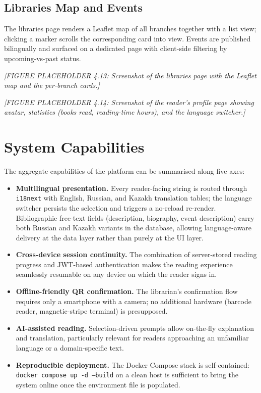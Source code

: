 \documentclass[12pt,a4paper]{report}
\begin{document}
\subsection{Libraries Map and Events}

The libraries page renders a Leaflet map of all branches together with
a list view; clicking a marker scrolls the corresponding card into
view. Events are published bilingually and surfaced on a dedicated
page with client-side filtering by upcoming-vs-past status.

\textit{[FIGURE PLACEHOLDER 4.13: Screenshot of the libraries page
with the Leaflet map and the per-branch cards.]}

\textit{[FIGURE PLACEHOLDER 4.14: Screenshot of the reader's
profile page showing avatar, statistics (books read, reading-time
hours), and the language switcher.]}

\section{System Capabilities}

The aggregate capabilities of the platform can be summarised along
five axes:

\begin{itemize}[leftmargin=*]
    \item \textbf{Multilingual presentation.} Every reader-facing
    string is routed through \texttt{i18next} with English, Russian,
    and Kazakh translation tables; the language switcher persists the
    selection and triggers a no-reload re-render. Bibliographic
    free-text fields (description, biography, event description)
    carry both Russian and Kazakh variants in the database, allowing
    language-aware delivery at the data layer rather than purely at
    the UI layer.
    \item \textbf{Cross-device session continuity.} The combination of
    server-stored reading progress and JWT-based authentication makes
    the reading experience seamlessly resumable on any device on
    which the reader signs in.
    \item \textbf{Offline-friendly QR confirmation.} The librarian's
    confirmation flow requires only a smartphone with a camera; no
    additional hardware (barcode reader, magnetic-stripe terminal)
    is presupposed.
    \item \textbf{AI-assisted reading.} Selection-driven prompts allow
    on-the-fly explanation and translation, particularly relevant
    for readers approaching an unfamiliar language or a
    domain-specific text.
    \item \textbf{Reproducible deployment.} The Docker Compose stack
    is self-contained: \texttt{docker compose up -d --build} on a
    clean host is sufficient to bring the system online once the
    environment file is populated.
\end{itemize}
\end{document}
